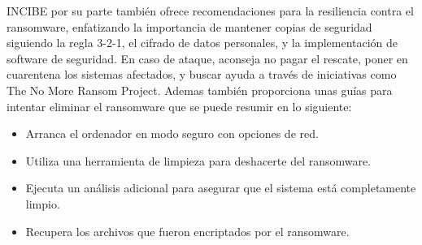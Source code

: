 INCIBE\autocite{incibe_nd_ayuda} por su parte también ofrece recomendaciones para la resiliencia contra el ransomware, enfatizando la importancia de mantener copias de seguridad siguiendo la regla 3-2-1, el cifrado de datos personales, y la implementación de software de seguridad. En caso de ataque, aconseja no pagar el rescate, poner en cuarentena los sistemas afectados, y buscar ayuda a través de iniciativas como The No More Ransom Project. Ademas también proporciona unas guías\autocite{incibe_nd_actuar} para intentar eliminar el ransomware que se puede resumir en lo siguiente:
\begin{itemize}
    \item Arranca el ordenador en modo seguro con opciones de red.
    \item Utiliza una herramienta de limpieza para deshacerte del ransomware.
    \item Ejecuta un análisis adicional para asegurar que el sistema está completamente limpio.
    \item Recupera los archivos que fueron encriptados por el ransomware.
\end{itemize}